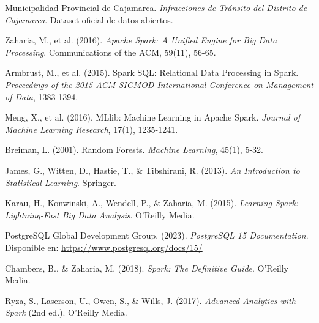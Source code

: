 \documentclass[12pt,a4paper]{article}
\begin{document}
\begin{enumerate}[label={[\arabic*]}, leftmargin=*]
    \item Municipalidad Provincial de Cajamarca. \textit{Infracciones de Tránsito del Distrito de Cajamarca}. Dataset oficial de datos abiertos.
    
    \item Zaharia, M., et al. (2016). \textit{Apache Spark: A Unified Engine for Big Data Processing}. Communications of the ACM, 59(11), 56-65.
    
    \item Armbrust, M., et al. (2015). Spark SQL: Relational Data Processing in Spark. \textit{Proceedings of the 2015 ACM SIGMOD International Conference on Management of Data}, 1383-1394.
    
    \item Meng, X., et al. (2016). MLlib: Machine Learning in Apache Spark. \textit{Journal of Machine Learning Research}, 17(1), 1235-1241.
    
    \item Breiman, L. (2001). Random Forests. \textit{Machine Learning}, 45(1), 5-32.
    
    \item James, G., Witten, D., Hastie, T., \& Tibshirani, R. (2013). \textit{An Introduction to Statistical Learning}. Springer.
    
    \item Karau, H., Konwinski, A., Wendell, P., \& Zaharia, M. (2015). \textit{Learning Spark: Lightning-Fast Big Data Analysis}. O'Reilly Media.
    
    \item PostgreSQL Global Development Group. (2023). \textit{PostgreSQL 15 Documentation}. Disponible en: \url{https://www.postgresql.org/docs/15/}
    
    \item Chambers, B., \& Zaharia, M. (2018). \textit{Spark: The Definitive Guide}. O'Reilly Media.
    
    \item Ryza, S., Laserson, U., Owen, S., \& Wills, J. (2017). \textit{Advanced Analytics with Spark} (2nd ed.). O'Reilly Media.

\end{enumerate}
\end{document}
